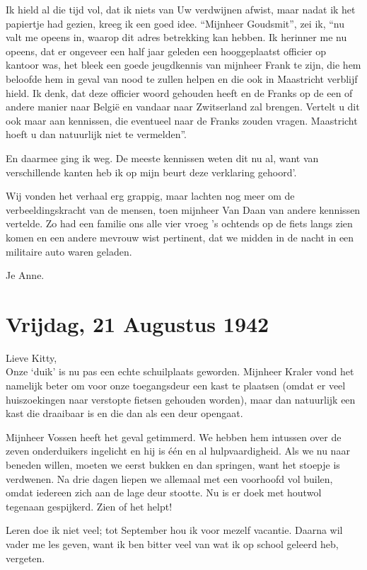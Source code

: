 \documentclass{book}
\begin{document}
Ik hield al die tijd vol, dat ik niets van Uw verdwijnen afwist, maar nadat ik
het papiertje had gezien, kreeg ik een goed idee. ``Mijnheer Goudsmit'', zei ik,
``nu valt me opeens in, waarop dit adres betrekking kan hebben. Ik herinner me
nu opeens, dat er ongeveer een half jaar geleden een hooggeplaatst officier op
kantoor was, het bleek een goede jeugdkennis van mijnheer Frank te zijn, die hem
beloofde hem in geval van nood te zullen helpen en die ook in Maastricht
verblijf hield. Ik denk, dat deze officier woord gehouden heeft en de Franks op
de een of andere manier naar België en vandaar naar Zwitserland zal brengen.
Vertelt u dit ook maar aan kennissen, die eventueel naar de Franks zouden
vragen. Maastricht hoeft u dan natuurlijk niet te vermelden''.

En daarmee ging ik weg. De meeste kennissen weten dit nu al, want van
verschillende kanten heb ik op mijn beurt deze verklaring gehoord'.

Wij vonden het verhaal erg grappig, maar lachten nog meer om de
verbeeldingskracht van de mensen, toen mijnheer Van Daan van andere kennissen
vertelde. Zo had een familie ons alle vier vroeg 's ochtends op de fiets langs
zien komen en een andere mevrouw wist pertinent, dat we midden in de nacht in
een militaire auto waren geladen.

Je Anne.

\section*{Vrijdag, 21 Augustus 1942}

Lieve Kitty,\\
Onze `duik' is nu pas een echte schuilplaats geworden.  Mijnheer
Kraler vond het namelijk beter om voor onze toegangsdeur een kast te plaatsen
(omdat er veel huiszoekingen naar verstopte fietsen gehouden worden), maar dan
natuurlijk een kast die draaibaar is en die dan als een deur opengaat.

Mijnheer Vossen heeft het geval getimmerd. We hebben hem intussen over de zeven
onderduikers ingelicht en hij is één en al hulpvaardigheid. Als we nu naar
beneden willen, moeten we eerst bukken en dan springen, want het stoepje is
verdwenen. Na drie dagen liepen we allemaal met een voorhoofd vol builen, omdat
iedereen zich aan de lage deur stootte. Nu is er doek met houtwol tegenaan
gespijkerd. Zien of het helpt!

Leren doe ik niet veel; tot September hou ik voor mezelf vacantie.  Daarna wil
vader me les geven, want ik ben bitter veel van wat ik op school geleerd heb,
vergeten.
\end{document}
